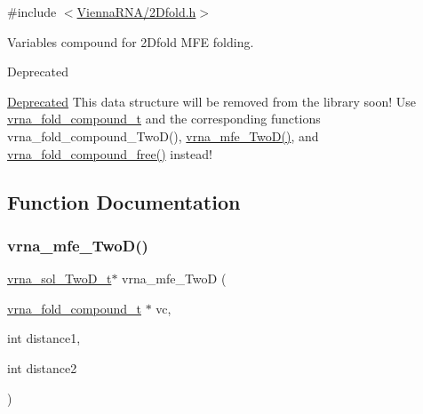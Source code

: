 {\ttfamily \#include $<$\hyperlink{2Dfold_8h}{Vienna\+R\+N\+A/2\+Dfold.\+h}$>$}



Variables compound for 2\+Dfold M\+FE folding. 

\begin{DoxyRefDesc}{Deprecated}
\item[\hyperlink{deprecated__deprecated000001}{Deprecated}]This data structure will be removed from the library soon! Use \hyperlink{group__fold__compound_ga1b0cef17fd40466cef5968eaeeff6166}{vrna\+\_\+fold\+\_\+compound\+\_\+t} and the corresponding functions vrna\+\_\+fold\+\_\+compound\+\_\+\+Two\+D(), \hyperlink{group__kl__neighborhood__mfe_ga243c288b463147352829df04de6a2f77}{vrna\+\_\+mfe\+\_\+\+Two\+D()}, and \hyperlink{group__fold__compound_gadded6039d63f5d6509836e20321534ad}{vrna\+\_\+fold\+\_\+compound\+\_\+free()} instead! \end{DoxyRefDesc}


\subsection{Function Documentation}
\mbox{\label{group__kl__neighborhood__mfe_ga243c288b463147352829df04de6a2f77}} 
\subsubsection{\texorpdfstring{vrna\+\_\+mfe\+\_\+\+Two\+D()}{vrna\_mfe\_TwoD()}}
{\footnotesize\ttfamily \hyperlink{group__kl__neighborhood__mfe_structvrna__sol__TwoD__t}{vrna\+\_\+sol\+\_\+\+Two\+D\+\_\+t}$\ast$ vrna\+\_\+mfe\+\_\+\+TwoD (\begin{DoxyParamCaption}\item[{\hyperlink{group__fold__compound_ga1b0cef17fd40466cef5968eaeeff6166}{vrna\+\_\+fold\+\_\+compound\+\_\+t} $\ast$}]{vc,  }\item[{int}]{distance1,  }\item[{int}]{distance2 }\end{DoxyParamCaption})}



